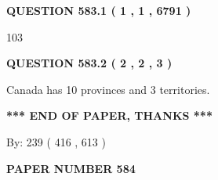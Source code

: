 \documentclass[12pt]{article}
\begin{document}
   
   
   
 \vspace{0.2in}
 
 
 
 
   
   
  
\vspace{0.2in}
  
{\textbf{\Large{QUESTION
583.1 
 ( 1 , 1 , 6791 )
}}}
  
  
 
 
\noindent{}

103
 
 
  
\vspace{0.2in}
  
{\textbf{\Large{QUESTION
583.2 
 ( 2 , 2 , 3 )
}}}
  
  
 
 
\noindent{}
 
 
Canada has 10  provinces and 3 territories.
 
 
 
 
   
   
 \vspace{0.2in}
 
   
   
   
   
\vspace{1.0in} 
{\textbf{\large{ *** END OF PAPER, THANKS *** }}} 
   
   
\hspace{1.0in} By: 
 239 ( 416 ,  613 )
   
   
   
   
\newpage 
\setcounter{page}{ 
   584001 } 
   
   
   
   
 {\textbf{ \Large{ PAPER NUMBER  584  }}}
   
   
\vspace{0.2in}
   
   
   
   
   
   
 \vspace{0.2in}
 
 
 
 
   
\end{document}
